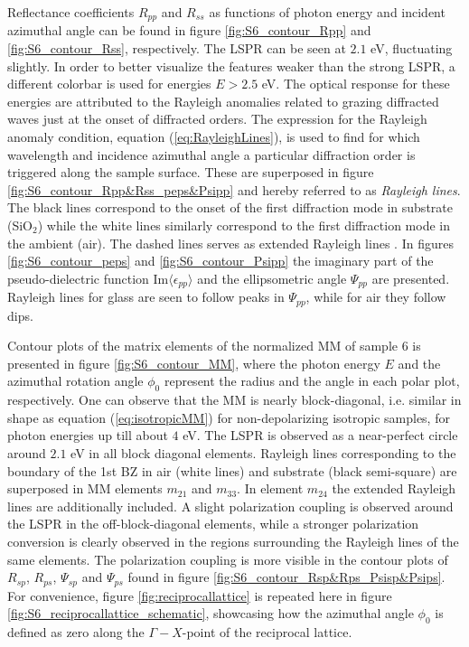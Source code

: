 Reflectance coefficients $R_{pp}$ and $R_{ss}$ as functions of photon energy and incident azimuthal angle can be found in figure \ref{fig:S6_contour_Rpp} and \ref{fig:S6_contour_Rss}, respectively. The LSPR can be seen at $2.1$ eV, fluctuating slightly. In order to better visualize the features weaker than the strong LSPR, a different colorbar is used for energies $E>2.5$ eV. The optical response for these energies are attributed to the Rayleigh anomalies related to grazing diffracted waves just at the onset of diffracted orders\cite{Brakstad:15}. The expression for the Rayleigh anomaly condition, equation (\ref{eq:RayleighLines}), is used to find for which wavelength and incidence azimuthal angle a particular diffraction order is triggered along the sample surface. These are superposed in figure \ref{fig:S6_contour_Rpp&Rss_peps&Psipp} and hereby referred to as \emph{Rayleigh lines}. The black lines correspond to the onset of the first diffraction mode in substrate (SiO$_2$) while the white lines similarly correspond to the first diffraction mode in the ambient (air). The dashed lines serves as extended Rayleigh lines . In figures \ref{fig:S6_contour_peps} and \ref{fig:S6_contour_Psipp} the imaginary part of the pseudo-dielectric function $\text{Im}\langle\epsilon_{pp}\rangle$ and the ellipsometric angle $\Psi_{pp}$ are presented. Rayleigh lines for glass are seen to follow peaks in $\Psi_{pp}$, while for air they follow dips. 


Contour plots of the matrix elements of the normalized MM of sample 6 is presented in figure \ref{fig:S6_contour_MM}, where the photon energy $E$ and the azimuthal rotation angle $\phi_0$ represent the radius and the angle in each polar plot, respectively. One can observe that the MM is nearly block-diagonal, i.e. similar in shape as equation (\ref{eq:isotropicMM}) for non-depolarizing isotropic samples, for photon energies up till about $4$ eV. The LSPR is observed as a near-perfect circle around $2.1$ eV in all block diagonal elements. Rayleigh lines corresponding to the boundary of the 1st BZ in air (white lines) and substrate (black semi-square) are superposed in MM elements $m_{21}$ and $m_{33}$. In element $m_{24}$ the extended Rayleigh lines are additionally included. A slight polarization coupling is observed around the LSPR in the off-block-diagonal elements, while a stronger polarization conversion is clearly observed in the regions surrounding the Rayleigh lines of the same elements. The polarization coupling is more visible in the contour plots of $R_{sp}$, $R_{ps}$, $\Psi_{sp}$ and $\Psi_{ps}$ found in figure \ref{fig:S6_contour_Rsp&Rps_Psisp&Psips}. For convenience, figure \ref{fig:reciprocallattice} is repeated here in figure \ref{fig:S6_reciprocallattice_schematic}, showcasing how the azimuthal angle $\phi_0$ is defined as zero along the $\Gamma-X$-point of the reciprocal lattice.


